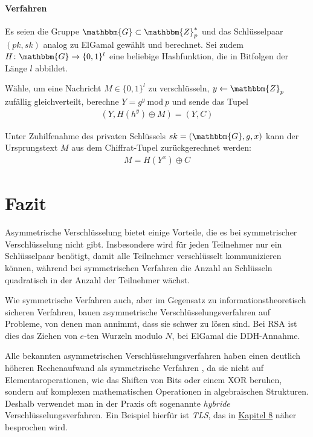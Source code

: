 \paragraph*{Verfahren} Es seien die Gruppe $\mathbbm{G} \subset
\mathbbm{Z}^*_p$ und das Schlüsselpaar $(pk,sk)$ analog zu ElGamal
gewählt und berechnet. Sei zudem $H \colon \mathbbm{G} \rightarrow
\{0,1\}^l$ eine beliebige Hashfunktion, die in Bitfolgen der Länge $l$
abbildet.

Wähle, um eine Nachricht $M \in \{0,1\}^l$ zu verschlüsseln, $y
\leftarrow \mathbbm{Z}_p$ zufällig gleichverteilt, berechne $Y = g^y\
\text{mod}\ p$ und sende das Tupel
\begin{align*} (Y, H(h^y) \oplus M) = (Y, C)
\end{align*}

Unter Zuhilfenahme des privaten Schlüssels $sk = (\mathbbm{G}, g, x)$
kann der Ursprungstext $M$ aus dem Chiffrat-Tupel zurückgerechnet
werden:
\begin{align*} M = H(Y^x) \oplus C
\end{align*}

\section{Fazit} Asymmetrische Verschlüsselung \indexEncryptionAsymm
bietet einige Vorteile, die es bei symmetrischer Verschlüsselung nicht
gibt. Insbesondere wird für jeden Teilnehmer nur ein Schlüsselpaar
benötigt, damit alle Teilnehmer verschlüsselt kommunizieren können,
während bei symmetrischen Verfahren die Anzahl an Schlüsseln quadratisch
in der Anzahl der Teilnehmer wächst.

Wie symmetrische Verfahren auch, aber im Gegensatz zu
informationstheoretisch sicheren Verfahren, bauen asymmetrische
Verschlüsselungsverfahren auf Probleme, von denen man annimmt, dass sie
schwer zu lösen sind. Bei RSA ist dies das Ziehen von $e$-ten Wurzeln
modulo $N$, bei ElGamal die DDH-Annahme.

Alle bekannten asymmetrischen Verschlüsselungsverfahren haben einen
deutlich höheren Rechenaufwand als symmetrische Verfahren
\indexEncryptionSymm, da sie nicht auf Elementaroperationen, wie das
Shiften von Bits oder einem XOR beruhen, sondern auf komplexen
mathematischen Operationen in algebraischen Strukturen. Deshalb
verwendet man in der Praxis oft sogenannte \emph{hybride}
Verschlüsselungsverfahren\indexEncryptionHybrid. Ein Beispiel hierfür
ist \emph{TLS}\indexTLS, das in \hyperref[cha:keyexchange]{Kapitel 8}
näher besprochen wird.